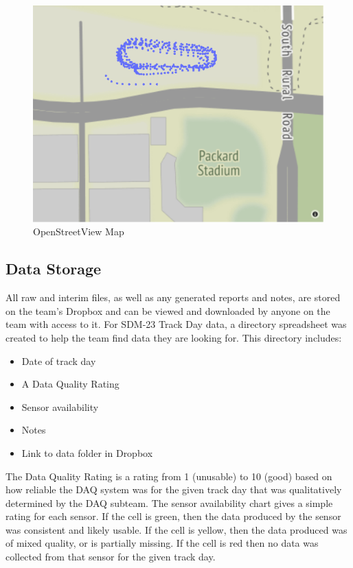 \begin{figure}[H]
    \centering
    \includegraphics[width=5in]{images/map.png}
    \caption{OpenStreetView Map}
    \label{fig:osvm}
\end{figure}

\subsection{Data Storage}
All raw and interim files, as well as any generated reports and notes, are stored on the team's Dropbox and can be viewed and downloaded by anyone on the team with access to it.
For SDM-23 Track Day data, a directory spreadsheet was created to help the team find data they are looking for.
This directory includes:
\begin{itemize}
    \item Date of track day
    \item A Data Quality Rating
    \item Sensor availability
    \item Notes
    \item Link to data folder in Dropbox
\end{itemize}
The Data Quality Rating is a rating from 1 (unusable) to 10 (good) based on how reliable the DAQ system was for the given track day that was qualitatively determined by the DAQ subteam.
The sensor availability chart gives a simple rating for each sensor.
If the cell is green, then the data produced by the sensor was consistent and likely usable.
If the cell is yellow, then the data produced was of mixed quality, or is partially missing.
If the cell is red then no data was collected from that sensor for the given track day.

